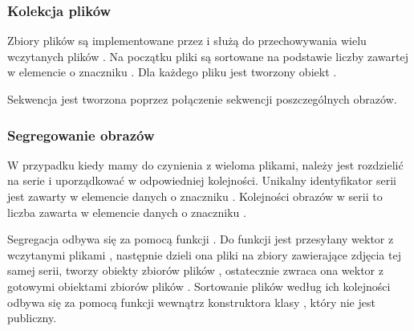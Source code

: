 \subsubsection{Kolekcja plików \DICOM}
\label{sec:sokar-dicomfileset}
\par
Zbiory plików są implementowane przez  i służą do przechowywania wielu wczytanych plików \DICOM.
Na początku pliki są sortowane na podstawie liczby zawartej w elemencie o znaczniku .
Dla każdego pliku jest tworzony obiekt .
\par
Sekwencja jest tworzona poprzez połączenie sekwencji poszczególnych obrazów.

\subsubsection{Segregowanie obrazów}
\label{sec:sokar-dicomfileset-create}
\par
W przypadku kiedy mamy do czynienia z wieloma plikami, należy jest rozdzielić na serie i uporządkować w odpowiedniej kolejności.
Unikalny identyfikator serii jest zawarty w elemencie danych o znaczniku .
Kolejności obrazów w serii to liczba zawarta w elemencie danych o znaczniku .
\par
Segregacja odbywa się za pomocą funkcji .
Do funkcji jest przesyłany wektor z wczytanymi plikami \DICOM, następnie dzieli ona pliki na zbiory zawierające zdjęcia tej samej serii, tworzy obiekty zbiorów plików \DICOM, ostatecznie zwraca ona wektor z gotowymi obiektami zbiorów plików \DICOM.
Sortowanie plików \DICOM według ich kolejności odbywa się za pomocą funkcji  wewnątrz konstruktora klasy , który nie jest publiczny.